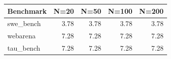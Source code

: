 \begin{tabular}{lrrrr}
Benchmark & N=20 & N=50 & N=100 & N=200 \\
\hline
swe_bench & 3.78 & 3.78 & 3.78 & 3.78 \\
webarena & 7.28 & 7.28 & 7.28 & 7.28 \\
tau_bench & 7.28 & 7.28 & 7.28 & 7.28 \\
\end{tabular}
